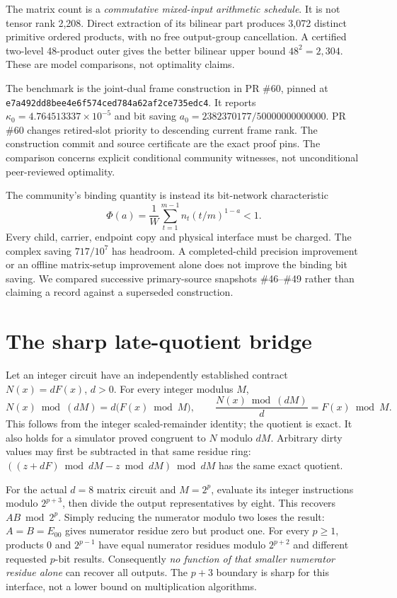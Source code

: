 \documentclass[11pt]{article}
\begin{document}
The matrix count is a \emph{commutative mixed-input arithmetic schedule}.
It is not tensor rank 2,208. Direct extraction of its bilinear part produces
3,072 distinct primitive ordered products, with no free output-group
cancellation. A certified two-level 48-product outer gives the better
bilinear upper bound $48^2=2,304$. These are model comparisons, not optimality
claims.

The benchmark is the joint-dual frame construction in PR \#60, pinned at
\texttt{e7a492dd8bee4e6f574ced784a62af2ce735edc4}. It reports
$\kappa_0=4.764513337\times10^{-5}$ and bit saving
$a_0=2382370177/50000000000000$. PR \#60 changes retired-slot priority to descending current frame rank.
The construction commit and source certificate are the exact proof pins. The comparison concerns explicit conditional
community witnesses, not unconditional peer-reviewed optimality.

The community's binding quantity is instead its bit-network characteristic
\begin{equation}\label{eq:moment}
 \Phi(a)=\frac1W\sum_{t=1}^{m-1} n_t(t/m)^{1-a}<1.
\end{equation}
Every child, carrier, endpoint copy and physical interface must be charged.
The complex saving $717/10^7$ has headroom. A completed-child precision
improvement or an offline matrix-setup improvement alone does not improve
the binding bit saving. We compared successive primary-source snapshots
\#46--\#49 rather than claiming a record against a superseded construction.

\section{The sharp late-quotient bridge}
Let an integer circuit have an independently established contract
$N(x)=dF(x)$, $d>0$. For every integer modulus $M$,
\begin{equation}\label{eq:quotient}
 N(x)\bmod(dM)=d\bigl(F(x)\bmod M\bigr),\qquad
 \frac{N(x)\bmod(dM)}d=F(x)\bmod M.
\end{equation}
This follows from the integer scaled-remainder identity; the quotient is
exact. It also holds for a simulator proved congruent to $N$ modulo $dM$.
Arbitrary dirty values may first be subtracted in that same residue ring:
$((z+dF)\bmod dM-z\bmod dM)\bmod dM$ has the same exact quotient.

For the actual $d=8$ matrix circuit and $M=2^p$, evaluate its integer
instructions modulo $2^{p+3}$, then divide the output representatives by
eight. This recovers $AB\bmod2^p$. Simply reducing the numerator modulo two
loses the result: $A=B=E_{00}$ gives numerator residue zero but product one.
For every $p\ge1$, products $0$ and $2^{p-1}$ have equal numerator residues
modulo $2^{p+2}$ and different requested $p$-bit results. Consequently
\emph{no function of that smaller numerator residue alone} can recover all
outputs. The $p+3$ boundary is sharp for this interface, not a lower bound
on multiplication algorithms.
\end{document}
